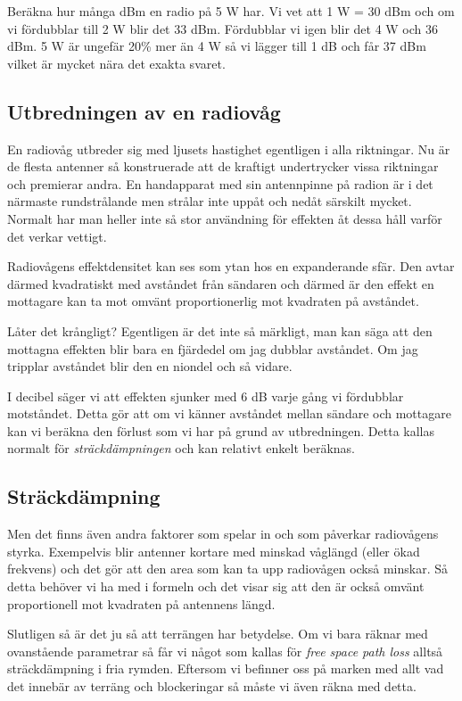 Beräkna hur många dBm en radio på 5 W har. Vi vet att 1 W = 30 dBm och om vi fördubblar till 2 W blir det 33 dBm. Fördubblar vi igen blir det 4 W och 36 dBm. 5 W är ungefär 20\% mer än 4 W så vi lägger till 1 dB och får 37 dBm vilket är mycket nära det exakta svaret.

\subsection{Utbredningen av en radiovåg}

En radiovåg utbreder sig med ljusets hastighet egentligen i alla riktningar. Nu är de flesta antenner så konstruerade att de kraftigt undertrycker vissa riktningar och premierar andra. En handapparat med sin antennpinne på radion är i det närmaste rundstrålande men strålar inte uppåt och nedåt särskilt mycket. Normalt har man heller inte så stor användning för effekten åt dessa håll varför det verkar vettigt.

Radiovågens effektdensitet kan ses som ytan hos en expanderande sfär. Den avtar därmed kvadratiskt med avståndet från sändaren och därmed är den effekt en mottagare kan ta mot omvänt proportionerlig mot kvadraten på avståndet.

Låter det krångligt? Egentligen är det inte så märkligt, man kan säga att den mottagna effekten blir bara en fjärdedel om jag dubblar avståndet. Om jag tripplar avståndet blir den en niondel och så vidare.

I decibel säger vi att effekten sjunker med 6 dB varje gång vi fördubblar motståndet. Detta gör att om vi känner avståndet mellan sändare och mottagare kan vi beräkna den förlust som vi har på grund av utbredningen. Detta kallas normalt för \textit{sträckdämpningen} och kan relativt enkelt beräknas.

\subsection{Sträckdämpning}

Men det finns även andra faktorer som spelar in och som påverkar radiovågens styrka. Exempelvis blir antenner kortare med minskad våglängd (eller ökad frekvens) och det gör att den area som kan ta upp radiovågen också minskar. Så detta behöver vi ha med i formeln och det visar sig att den är också omvänt proportionell mot kvadraten på antennens längd.

Slutligen så är det ju så att terrängen har betydelse. Om vi bara räknar med ovanstående parametrar så får vi något som kallas för \textit{free space path loss} alltså sträckdämpning i fria rymden. Eftersom vi befinner oss på marken med allt vad det innebär av terräng och blockeringar så måste vi även räkna med detta.

